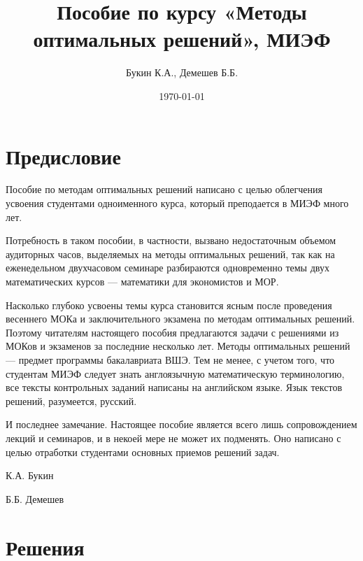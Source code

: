 \documentclass[a4paper, 12pt]{article}
\title{Пособие по курсу «Методы оптимальных решений», МИЭФ}
\author{Букин К.А., Демешев Б.Б.}
\date{\today}
\newcounter{problem}[section]
\begin{document}
\maketitle %
\tableofcontents


\section*{Предисловие}

Пособие по методам оптимальных решений написано с целью облегчения усвоения студентами одноименного курса, который преподается в МИЭФ много лет.

Потребность в таком пособии, в частности, вызвано недостаточным объемом аудиторных часов, выделяемых на методы оптимальных решений, так как на еженедельном двухчасовом семинаре разбираются одновременно темы двух математических курсов — математики для экономистов и МОР.

Насколько глубоко усвоены темы курса становится ясным после проведения весеннего МОКа и заключительного экзамена по методам оптимальных решений. Поэтому читателям настоящего пособия предлагаются задачи с решениями из МОКов и экзаменов за последние несколько лет.
Методы оптимальных решений — предмет программы бакалавриата ВШЭ. Тем не менее, с учетом того, что студентам МИЭФ следует знать англоязычную математическую терминологию, все тексты контрольных заданий написаны на английском языке. Язык текстов решений, разумеется, русский.

И последнее замечание.  Настоящее пособие является всего лишь сопровождением лекций и семинаров, и в некоей мере не может их подменять. Оно написано с целью отработки студентами основных приемов решений задач.

К.А. Букин

Б.Б. Демешев






\section{Решения}

\renewenvironment{solution}[1]{%
         \vskip .5cm plus 2cm minus 0.1cm%
         {\bfseries \hyperlink{problem:#1}{#1.}}%
}%
{%
}%


\end{document}
